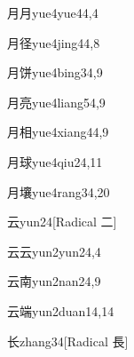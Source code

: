\begin{verbete}{月月}{yue4yue4}{4,4}
\end{verbete}

\begin{verbete}{月径}{yue4jing4}{4,8}
\end{verbete}

\begin{verbete}{月饼}{yue4bing3}{4,9}
\end{verbete}

\begin{verbete}{月亮}{yue4liang5}{4,9}
\end{verbete}

\begin{verbete}{月相}{yue4xiang4}{4,9}
\end{verbete}

\begin{verbete}{月球}{yue4qiu2}{4,11}
\end{verbete}

\begin{verbete}{月壤}{yue4rang3}{4,20}
\end{verbete}

\begin{verbete}{云}{yun2}{4}[Radical 二]
\end{verbete}

\begin{verbete}{云云}{yun2yun2}{4,4}
\end{verbete}

\begin{verbete}{云南}{yun2nan2}{4,9}
\end{verbete}

\begin{verbete}{云端}{yun2duan1}{4,14}
\end{verbete}

\begin{verbete}{长}{zhang3}{4}[Radical 長]
\end{verbete}

